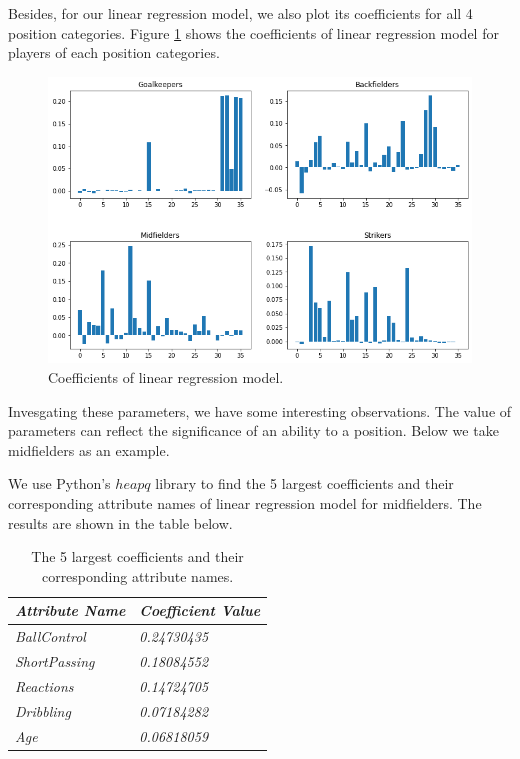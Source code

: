 \documentclass{article}
\begin{document}
Besides, for our linear regression model, we also plot its coefficients for all 4 position categories. Figure \ref{fig5} shows the coefficients of linear regression model for players of each position categories.

\begin{figure}[!htb]
	\centering
    \includegraphics[scale=0.5]{coefs.png}
    \caption{Coefficients of linear regression model.}\label{fig5}
\end{figure}

Invesgating these parameters, we have some interesting observations. The value of parameters can reflect the significance of an ability to a position. Below we take midfielders as an example.

We use Python's $heapq$ library to find the 5 largest coefficients and their corresponding attribute names of linear regression model for midfielders. The results are shown in the table below.

\begin{table}[htpb]
    \centering
    \begin{tabular}{|l|l|}
    \hline
    \textit{Attribute Name}             &       \textit{Coefficient Value} \\ \hline
    \textit{BallControl}                &       \textit{0.24730435} \\ \hline
    \textit{ShortPassing}               &       \textit{0.18084552} \\ \hline
    \textit{Reactions}                  &       \textit{0.14724705} \\ \hline
    \textit{Dribbling}                  &       \textit{0.07184282} \\ \hline
    \textit{Age}                        &       \textit{0.06818059} \\ \hline
    \end{tabular}
    \caption{The 5 largest coefficients and their corresponding attribute names.}
\end{table}
\end{document}
